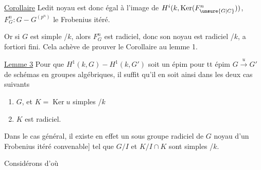 \uline{Corollaire} Ledit noyau est donc égal à l'image de $H^i(k,\operatorname{Ker}(F_{\unsure{G|C}}^n))$, $F_G^n:G-G^{(p^n)}$ le Frobenius itéré.

Or si $G$ est simple /$k$, alors $F_G^n$ est radiciel, donc son noyau est radiciel /$k$, a fortiori fini. Cela achève de prouver le Corollaire au lemme 1.

\uline{Lemme 3} Pour que $H^1(k,G)-H^1(k,G')$ soit un épim pour tt épim $G\xrightarrow{u}G'$ de schémas en groupes algébriques, il suffit qu'il en soit ainsi dans les deux cas suivants

\begin{enumerate}[label=\alph*)]
\item $G$,  et $K=\operatorname{Ker}u$   simples /$k$
\item $K$ est radiciel.
\end{enumerate}

Dans le cas général, il existe en effet un sous groupe radiciel  de $G$ \unsure{[|(}noyau d'un Frobenius itéré convenable] tel que $G/I$  et $K/I\cap K$ sont simples /$k$.

Considérons
 d'où

